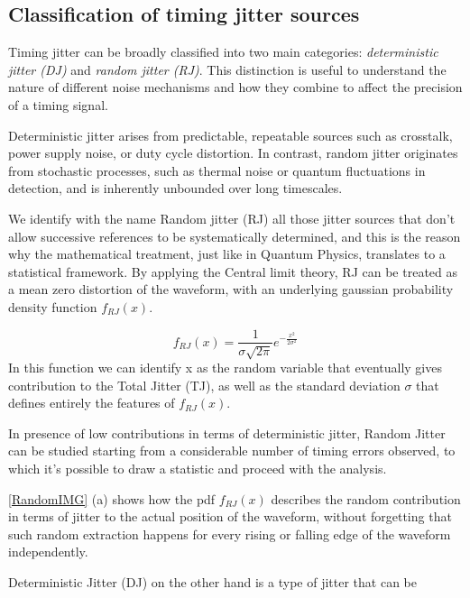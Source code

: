 \subsection{Classification of timing jitter sources}

Timing jitter can be broadly classified into two main categories: \emph{deterministic jitter (DJ)} and \emph{random jitter (RJ)}. This distinction is useful to understand the nature of different noise mechanisms and how they combine to affect the precision of a timing signal.

Deterministic jitter arises from predictable, repeatable sources such as crosstalk, power supply noise, or duty cycle distortion. In contrast, random jitter originates from stochastic processes, such as thermal noise or quantum fluctuations in detection, and is inherently unbounded over long timescales.

We identify with the name Random jitter (RJ) all those jitter sources that don't allow successive references to be systematically determined, and this is the reason why the mathematical treatment, just like in Quantum Physics, translates to a statistical framework.
By applying the Central limit theory, RJ can be treated as a mean zero distortion of the waveform, with an underlying gaussian probability density function $f_{RJ}(x)$.

\begin{equation}
f_{RJ}(x) = \frac{1}{\sigma \sqrt{2 \pi }}e^{-\frac{x^2}{2 \sigma ^2}}
\label{eq:RandJitter}
\end{equation}
In this function we can identify x as the random variable that eventually gives contribution to the Total Jitter (TJ), as well as the standard deviation $\sigma$ that defines entirely the features of $f_{RJ}(x)$.

In presence of low contributions in terms of deterministic jitter, Random Jitter can be studied starting from a considerable number of timing errors observed, to which it's possible to draw a statistic and proceed with the analysis.

\autoref{RandomIMG} (a) shows how the pdf $f_{RJ}(x)$ describes the random contribution in terms of jitter to the actual position of the waveform, without forgetting that such random extraction  happens for every rising or falling edge of the waveform independently.

Deterministic Jitter (DJ) on the other hand is a type of jitter that can be 

